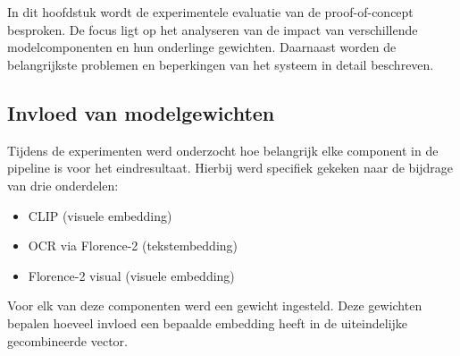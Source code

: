 \chapter{}%
\label{ch:experieval}

In dit hoofdstuk wordt de experimentele evaluatie van de proof-of-concept besproken. De focus ligt op het analyseren van de impact van verschillende modelcomponenten en hun onderlinge gewichten. Daarnaast worden de belangrijkste problemen en beperkingen van het systeem in detail beschreven.

\section{Invloed van modelgewichten}

Tijdens de experimenten werd onderzocht hoe belangrijk elke component in de pipeline is voor het eindresultaat. Hierbij werd specifiek gekeken naar de bijdrage van drie onderdelen:
\begin{itemize}
    \item CLIP (visuele embedding)
    \item OCR via Florence-2 (tekstembedding)
    \item Florence-2 visual (visuele embedding)
\end{itemize}

Voor elk van deze componenten werd een gewicht ingesteld. Deze gewichten bepalen hoeveel invloed een bepaalde embedding heeft in de uiteindelijke gecombineerde vector.


